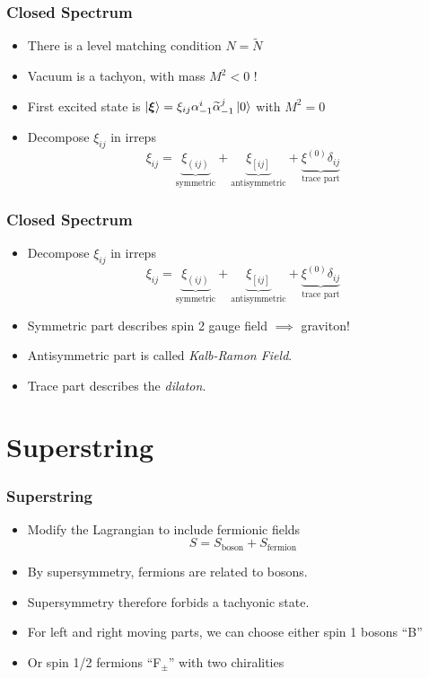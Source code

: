 \documentclass{beamer}
\renewcommand{\tilde}{\widetilde}
\begin{document}
\begin{frame}
\frametitle{Closed Spectrum}
\begin{itemize}
\item There is a level matching condition $N= \tilde N$
\item Vacuum is a tachyon, with mass $M^{2}<0$ !
\item First excited state is $\ket{\boldsymbol {\xi}} =  \xi_{ij} \alpha_{-1}^{i} \tilde \alpha^{j}_{-1} \ket 0  $ with $M^{2}=0$
\item Decompose $\xi_{ij}$ in irreps
  \[\xi_{ij} = \underbrace{\xi_{(ij)}}_{\text{symmetric}} +\underbrace{ \xi_{[ij]}}_{\text{antisymmetric}} +\underbrace{ \xi^{(0)} \delta_{ij}}_{\text{trace part}}\]
  
\end{itemize}
\end{frame}

\begin{frame}
  \frametitle{Closed Spectrum}
  \begin{itemize}
  \item Decompose $\xi_{ij}$ in irreps
  \[\xi_{ij} = \underbrace{\xi_{(ij)}}_{\text{symmetric}} +\underbrace{ \xi_{[ij]}}_{\text{antisymmetric}} +\underbrace{ \xi^{(0)} \delta_{ij}}_{\text{trace part}}\]
  \item Symmetric part describes spin 2 gauge field $\implies$ graviton!
  \item Antisymmetric part is called \emph{Kalb-Ramon Field}.
  \item Trace part describes the \emph{dilaton}.
  \end{itemize}
\end{frame}

\section{Superstring}



\begin{frame}
  \frametitle{Superstring}
  \begin{itemize}
  \item Modify the Lagrangian to include fermionic fields
    \[ S = S_{\text{boson}} + S_{\text{fermion}}\]
  \item By supersymmetry, fermions are related to bosons. \pause
  \item Supersymmetry therefore forbids a tachyonic state. \pause
  \item For left and right moving parts, we can choose either spin 1 bosons ``B''
  \item Or spin 1/2 fermions ``F$_{\pm}$'' with two chiralities

  \end{itemize}
  
\end{frame}
\end{document}
